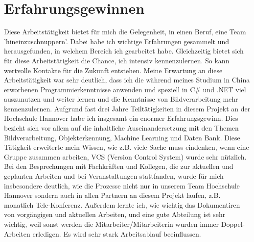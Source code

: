 \documentclass[10pt,a4paper]{report}
\begin{document}
\section{Erfahrungsgewinnen}
Diese Arbeitstätigkeit bietet für mich die Gelegenheit, in einen Beruf, eine Team 'hineinzuschnuppern'. Dabei habe ich wichtige Erfahrungen gesammelt und herausgefunden, in welchem Bereich ich gearbeitet habe. Gleichzeitig bietet sich für diese Arbeitstätigkeit die Chance, ich intensiv kennenzulernen. So kann wertvolle Kontakte für die Zukunft entstehen. Meine Erwartung an diese Arbeitstätigkeit war sehr deutlich, dass ich die während meines Studium in China erworbenen Programmierkenntnisse anwenden und speziell in C\# und .NET viel auszunutzen und weiter lernen und die Kenntnisse von Bildverarbeitung mehr kennenzulernen. 
Aufgrund fast drei Jahre Teiltätigkeiten in diesem Projekt an der Hochschule Hannover habe ich insgesamt ein enormer Erfahrungsgewinn. Dies bezieht sich vor allem auf die inhaltliche Auseinandersetzung mit den Themen Bildverarbeitung, Objekterkennung, Machine Learning und Daten Bank. Diese Tätigkeit erweiterte mein Wissen, wie z.B. viele Sache muss eindenken, wenn eine Gruppe zusammen arbeiten, VCS (Version Control System) wurde sehr nützlich. Bei den Besprechungen mit Fachkräften und Kollegen, die zur aktuellen und geplanten Arbeiten und bei Veranstaltungen stattfanden, wurde für mich insbesondere deutlich, wie die Prozesse nicht nur in unserem Team Hochschule Hannover sondern auch in allen Partnern an diesem Projekt laufen, z.B. monatlich Tele-Konferenz. Außerdem lernte ich, wie wichtig das Dokumentiren von vorgängigen und aktuellen Arbeiten, und eine gute Abteilung ist sehr wichtig, weil sonst werden die Mitarbeiter/Mitarbeiterin wurden immer Doppel-Arbeiten erledigen. Es wird sehr stark Arbeitsablauf beeinflussen. 
\end{document}
